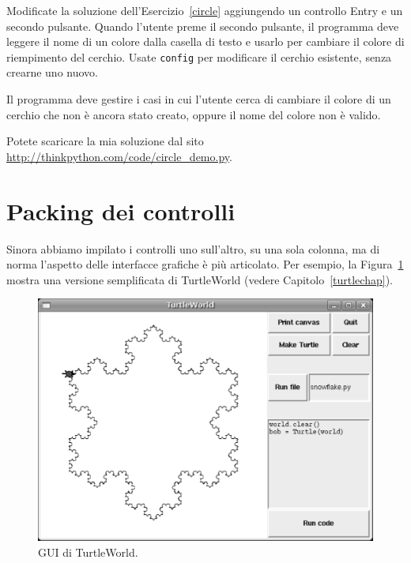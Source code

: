 \documentclass[10pt]{book}
\begin{document}
\vspace{0.2in}
\begin{exercise}
\label{circle2}

Modificate la soluzione dell'Esercizio~\ref{circle} aggiungendo un controllo Entry e un secondo pulsante. Quando l'utente preme il secondo pulsante, il programma deve leggere il nome di un colore dalla casella di testo e usarlo per cambiare il colore di riempimento del cerchio. Usate {\tt config}
per modificare il cerchio esistente, senza crearne uno nuovo.

Il programma deve gestire i casi in cui l'utente cerca di cambiare il colore di un cerchio che non è ancora stato creato, oppure il nome del colore non è valido.

Potete scaricare la mia soluzione dal sito \url{http://thinkpython.com/code/circle_demo.py}.

\end{exercise}


\section{Packing dei controlli}

Sinora abbiamo impilato i controlli uno sull'altro, su una sola colonna, ma di norma l'aspetto delle interfacce grafiche è più articolato. Per esempio, la Figura~\ref{fig.turtleworld} mostra una versione semplificata di
TurtleWorld (vedere Capitolo~\ref{turtlechap}).

\begin{figure}
\centerline{\includegraphics[scale=0.5]{figs/TurtleWorld.pdf}}
\caption{GUI di TurtleWorld.}
\label{fig.turtleworld}
\end{figure}
\end{document}
